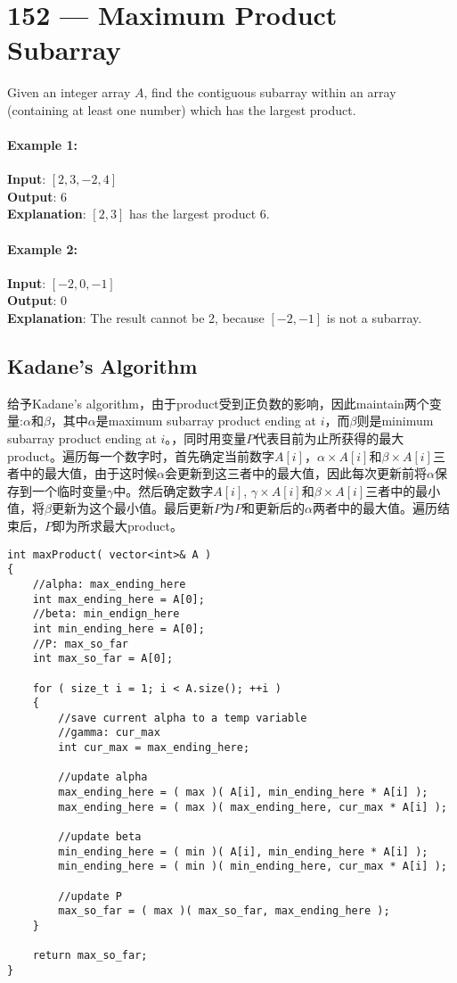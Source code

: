 \section{152 --- Maximum Product Subarray}
Given an integer array $A$, find the contiguous subarray within an array (containing at least one number) which has the largest product.
\paragraph{Example 1:}
\begin{flushleft}
\textbf{Input}: $[2,3,-2,4]$
\\
\textbf{Output}: 6
\\
\textbf{Explanation}: $[2,3]$ has the largest product 6.
\end{flushleft}
\paragraph{Example 2:}
\begin{flushleft}
\textbf{Input}: $[-2,0,-1]$
\\
\textbf{Output}: 0
\\
\textbf{Explanation}: The result cannot be 2, because $[-2,-1]$ is not a subarray.
\end{flushleft}
\subsection{Kadane's Algorithm}
\begin{CJK*}{UTF8}{gbsn}
给予Kadane's algorithm，由于product受到正负数的影响，因此maintain两个变量:$\alpha$和$\beta$，其中$\alpha$是maximum subarray product ending at $i$，而$\beta$则是minimum subarray product ending at $i$。，同时用变量$P$代表目前为止所获得的最大product。遍历每一个数字时，首先确定当前数字$A[i]$，$\alpha\times A[i]$和$\beta\times A[i]$三者中的最大值，由于这时候$\alpha$会更新到这三者中的最大值，因此每次更新前将$\alpha$保存到一个临时变量$\gamma$中。然后确定数字$A[i]$, $\gamma\times A[i]$和$\beta\times A[i]$三者中的最小值，将$\beta$更新为这个最小值。最后更新$P$为$P$和更新后的$\alpha$两者中的最大值。遍历结束后，$P$即为所求最大product。
\end{CJK*}
\setcounter{lstlisting}{0}
\begin{lstlisting}[style=customc, caption={Modified Kadane's Algorithm}]
int maxProduct( vector<int>& A )
{
	//alpha: max_ending_here
	int max_ending_here = A[0];
	//beta: min_endign_here
	int min_ending_here = A[0];
	//P: max_so_far
	int max_so_far = A[0];

	for ( size_t i = 1; i < A.size(); ++i )
	{
		//save current alpha to a temp variable
		//gamma: cur_max
		int cur_max = max_ending_here;

		//update alpha
		max_ending_here = ( max )( A[i], min_ending_here * A[i] );
		max_ending_here = ( max )( max_ending_here, cur_max * A[i] );

		//update beta
		min_ending_here = ( min )( A[i], min_ending_here * A[i] );
		min_ending_here = ( min )( min_ending_here, cur_max * A[i] );

		//update P
		max_so_far = ( max )( max_so_far, max_ending_here );
	}

	return max_so_far;
}
\end{lstlisting}